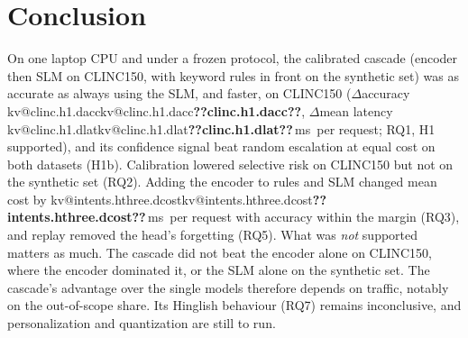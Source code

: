 \documentclass[11pt,a4paper]{article}
\makeatletter
\DeclareRobustCommand{\kv}[1]{\ifcsname kv@#1\endcsname\csname kv@#1\endcsname\else\textbf{??#1??}\fi}
\newcommand{\ms}{\,ms}
\makeatother
\begin{document}
\section{Conclusion}\label{sec:conclusion}

On one laptop CPU and under a frozen protocol, the calibrated cascade (encoder then SLM on CLINC150, with keyword rules
in front on the synthetic set) was as accurate as always using the SLM, and faster, on CLINC150 ($\Delta$accuracy \kv{clinc.h1.dacc}, $\Delta$mean latency
\kv{clinc.h1.dlat}\ms\ per request; RQ1, H1 supported), and its confidence signal beat random escalation at equal cost on both datasets (H1b).
Calibration lowered selective risk on CLINC150 but not on the synthetic set (RQ2). Adding the encoder to rules and SLM
changed mean cost by \kv{intents.hthree.dcost}\ms\ per request with accuracy within the margin (RQ3), and replay removed the head's forgetting
(RQ5). What was \emph{not} supported matters as much. The cascade did not beat the encoder alone on CLINC150, where the
encoder dominated it, or the SLM alone on the synthetic set. The cascade's advantage over the single models therefore
depends on traffic, notably on the out-of-scope share. Its Hinglish behaviour (RQ7) remains inconclusive, and
personalization and quantization are still to run.



\end{document}
